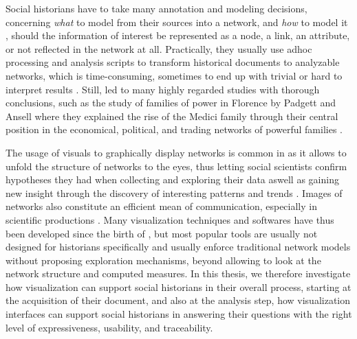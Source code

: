 Social historians have to take many annotation and modeling decisions, concerning \emph{what} to model from their sources into a network, and \emph{how} to model it \cite{cristofoliAuxSourcesGrands2008, dufournaudRechercheEmpiriqueHistoire2015}, \ie should the information of interest be represented as a node, a link, an attribute, or not reflected in the network at all.
Practically, they usually use adhoc processing and analysis scripts to transform historical documents to analyzable networks, which is time-consuming, sometimes to end up with trivial or hard to interpret results \cite{alkadi2022}.
Still, \hsna led to many highly regarded studies with thorough conclusions, such as the study of families of power in Florence by Padgett and Ansell where they explained the rise of the Medici family through their central position in the economical, political, and trading networks of powerful families \cite{padgettRobustActionRise1993}.

The usage of visuals to graphically display networks is common in \sna as it allows to unfold the structure of networks to the eyes, thus letting social scientists confirm hypotheses they had when collecting and exploring their data aswell as gaining new insight through the discovery of interesting patterns and trends \cite{cristofoliPrincipesUsagesDessins}.
Images of networks also constitute an efficient mean of communication, especially in scientific productions \cite{freemanVisualizingSocialNetworks2000}.
Many visualization techniques and softwares have thus been developed since the birth of \sna, but most popular tools are usually not designed for historians specifically and usually enforce traditional network models without proposing exploration mechanisms, beyond allowing to look at the network structure and computed measures.
In this thesis, we therefore investigate how visualization can support social historians in their overall process, starting at the acquisition of their document, and also at the analysis step, \ie  how visualization interfaces can support social historians in answering their questions with the right level of expressiveness, usability, and traceability.






